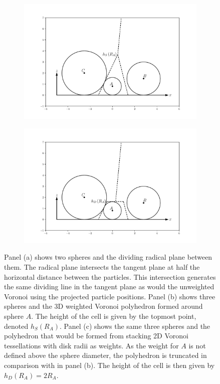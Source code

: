 \begin{figure}[tb]
     \begin{subfigure}[b]{0.48\textwidth}
         \centering
         \includegraphics[width=\textwidth]{./figures/quasi2d/qtd_dia_b.pdf}
         \caption{}
         \label{fig:qtddb}
     \end{subfigure}
     \hfill
     \begin{subfigure}[b]{0.48\textwidth}
         \centering
         \includegraphics[width=\textwidth]{./figures/quasi2d/qtd_dia_c.pdf}
         \caption{}
         \label{fig:qtddc}
     \end{subfigure}
     
     	\caption{Panel (a) shows two spheres and the dividing radical plane between them. The radical plane intersects the tangent plane at half the horizontal distance between the particles. This intersection generates the same dividing line in the tangent plane as would the unweighted Voronoi using the projected particle positions.
Panel (b) shows three spheres and the 3D weighted Voronoi polyhedron formed around sphere $A$. The height of the cell is given by the topmost point, denoted $h_S\left(R_A\right)$. Panel (c) shows the same three spheres and the polyhedron that would be formed from stacking 2D Voronoi tessellations with disk radii as weights. As the weight for $A$ is not defined above the sphere diameter, the polyhedron is truncated in comparison with in panel (b). The height of the cell is then given by $h_D\left(R_A\right)=2R_A$.}
	\label{fig:qtdd}
\end{figure}

